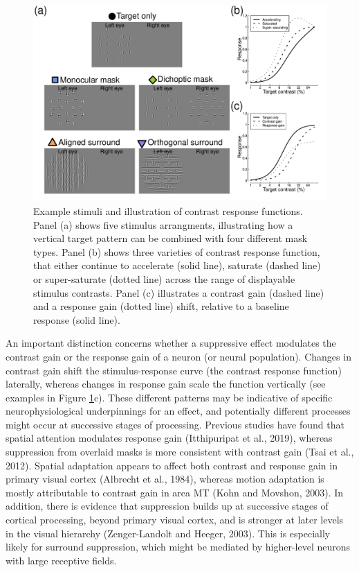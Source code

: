 \documentclass[]{article}
\begin{document}
\begin{figure}

{\centering \includegraphics{figures/stimfig} 

}

\caption{Example stimuli and illustration of contrast response functions. Panel (a) shows five stimulus arrangments, illustrating how a vertical target pattern can be combined with four different mask types. Panel (b) shows three varieties of contrast response function, that either continue to accelerate (solid line), saturate (dashed line) or super-saturate (dotted line) across the range of displayable stimulus contrasts. Panel (c) illustrates a contrast gain (dashed line) and a response gain (dotted line) shift, relative to a baseline response (solid line).}\label{fig:stimfig}
\end{figure}

An important distinction concerns whether a suppressive effect modulates the contrast gain or the response gain of a neuron (or neural population). Changes in contrast gain shift the stimulus-response curve (the contrast response function) laterally, whereas changes in response gain scale the function vertically (see examples in Figure \ref{fig:stimfig}c). These different patterns may be indicative of specific neurophysiological underpinnings for an effect, and potentially different processes might occur at successive stages of processing. Previous studies have found that spatial attention modulates response gain (Itthipuripat et al., 2019), whereas suppression from overlaid masks is more consistent with contrast gain (Tsai et al., 2012). Spatial adaptation appears to affect both contrast and response gain in primary visual cortex (Albrecht et al., 1984), whereas motion adaptation is mostly attributable to contrast gain in area MT (Kohn and Movshon, 2003). In addition, there is evidence that suppression builds up at successive stages of cortical processing, beyond primary visual cortex, and is stronger at later levels in the visual hierarchy (Zenger-Landolt and Heeger, 2003). This is especially likely for surround suppression, which might be mediated by higher-level neurons with large receptive fields.
\end{document}
